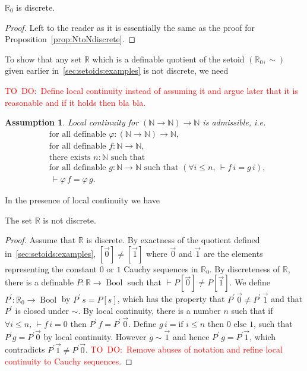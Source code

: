 \documentclass[envcountsame]{llncs}
\newcommand{\todo}[1]{\textcolor{red}{TO~DO:~#1}}
\newtheorem{assumption}[theorem]{Assumption}
\newcommand{\N}{\mathbb{N}}
\newcommand{\R}{\mathbb{R}}
\providecommand{\class}[1]{[#1]}
\DeclareMathOperator{\Bool}{Bool}
\newcommand{\fad}{\text{for all definable }}
\begin{document}
\begin{proposition}
 $\R_0$ is discrete.
\end{proposition}
\begin{proof}
Left to the reader as it is essentially the same as the proof for Proposition~\ref{prop:NtoNdiscrete}.
\end{proof}
To show that any set $\R$ which is a definable quotient of the setoid $(\R_0,\sim)$ given earlier in~\ref{sec:setoids:examples} is not discrete, we need

\todo{Define local continuity instead of assuming it and argue later that it is reasonable and if it holds then bla bla.}
\begin{assumption}
Local continuity  for $(\N \to \N) \to \N$ is admissible, i.e.
\begin{align*}
   &\fad \varphi : (\N \to \N) \to \N,\\
   &\fad f : \N \to \N,\\
   &\text{there exists }  n:\N\text{ such that }\\
   &\fad g : \N \to \N \text{ such that } (\forall i\leq n,\, \vdash f\,i = g\,i),\\
   &{\,\vdash \varphi\, f} = \varphi\, g.
\end{align*}
\end{assumption}

In the presence of local continuity we have
\begin{proposition}\label{prop:Rnotdiscrete} The set $\R$ is not discrete.
\end{proposition}
\begin{proof}
Assume that $\R$ is discrete. By exactness of the quotient defined in~\ref{sec:setoids:examples}, $\class{\vec 0} \neq \class{\vec 1}$ where $\vec 0$ and $\vec 1$ are the elements representing the constant $0$ or $1$ Cauchy sequences in $\R_0$. By discreteness of $\R$, there is a definable $P:\R\to\Bool$
such that $\vdash P\class{\vec 0}\neq P\class{\vec 1 }$. We define $P^\prime:\R_0\to\Bool$ by $P^\prime\,s = P\class{s}$, which has the property that $P^\prime\,\vec0\neq P^\prime\,\vec 1$ and that $P^\prime$ is closed under $\sim$. By local continuity, there is a number $n$  such that if $\forall i\leq n,\, \vdash f\,i = 0$ then $P^\prime \, f = P^\prime\,\vec 0$. Define $g\,i=\text{if } i\leq n \text{ then } 0 \text{ else } 1$, such that $P^\prime g =P^\prime \vec 0$ by local continuity. However $g \sim \vec 1$ and hence $P^\prime\,g=P^\prime \vec 1$, which contradicts $P^\prime \vec 1 \neq P^\prime \vec 0$.
\todo{Remove abuses of notation and refine local continuity to Cauchy sequences.}
\end{proof}
\end{document}
